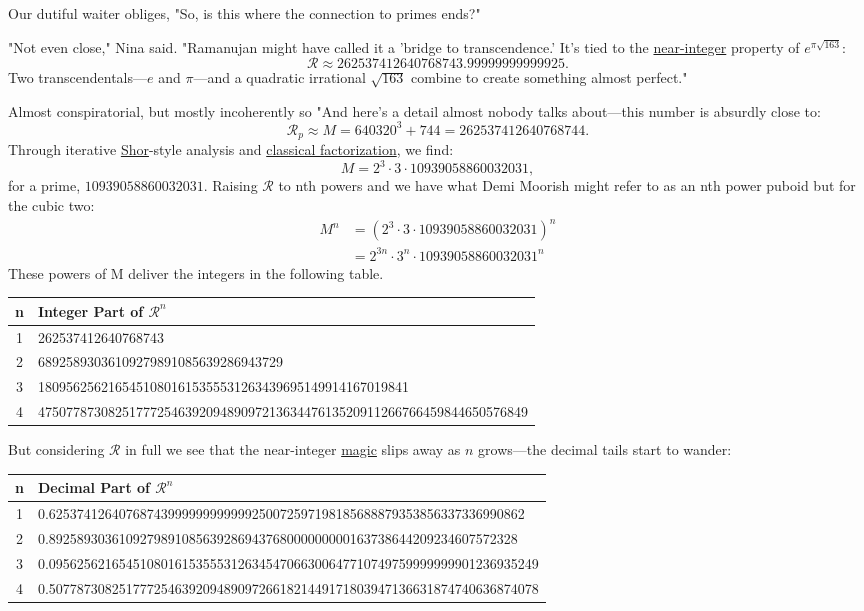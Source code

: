 Our dutiful waiter obliges, "So, is this where the connection to primes ends?"

"Not even close," Nina said. "Ramanujan might have called it a 'bridge to transcendence.' It’s tied to the \href{https://colab.research.google.com/drive/1K3itZdpqQkzb5UDWO-3MrIe6-KwopK0q?usp=sharing}{near-integer} property of \(e^{\pi \sqrt{163}}\):
\[
\mathcal{R} \approx 262537412640768743.99999999999925.
\]
Two transcendentals—\(e\) and \(\pi\)—and a quadratic irrational \(\sqrt{163}\) combine to create something almost perfect."

Almost conspiratorial, but mostly incoherently so "And here’s a detail almost nobody talks about—this number is absurdly close to:
\[
\mathcal{R}_p\approx M = 640320^3 + 744= 262537412640768744.
\]
Through iterative \href{https://colab.research.google.com/drive/1hn_NBpzrlv1TNKeRQAPDLabW04Jya0tv?usp=sharing}{Shor}-style analysis and \href{https://colab.research.google.com/drive/1Io6trNJBcgsMHd2it5qg-_ZYuJLJOb8p?usp=sharing}{classical factorization}, we find:
\[
M = 2^3 \cdot 3 \cdot 10939058860032031,
\]
for a prime, \(10939058860032031\). Raising \(\mathcal{R}\) to nth powers and we have what Demi Moorish might refer to as an nth power puboid but for the cubic two:
\begin{align*}
M^n &= (2^3 \cdot 3 \cdot 10939058860032031)^n\\
&= 2^{3n} \cdot 3^n \cdot 10939058860032031^n
\end{align*}
These powers of M deliver the integers in the following table.

\begin{longtable}{|c|p{12cm}|}
\hline
\textbf{n} & \textbf{Integer Part of \( \mathcal{R}^n \)} \\
\hline
1 & 262537412640768743 \\
2 & 68925893036109279891085639286943729 \\
3 & 18095625621654510801615355531263439695149914167019841 \\
4 & 4750778730825177725463920948909721363447613520911266766459844650576849 \\
\hline
\end{longtable}
\noindent
But considering \(\mathcal{R}\) in full we see that the near-integer \href{https://ramanunjan-rhapsody.vercel.app/}{magic} slips away as \(n\) grows—the decimal tails start to wander:

\begin{longtable}{|c|p{12cm}|}
\hline
\textbf{n} & \textbf{Decimal Part of \( \mathcal{R}^n \)} \\
\hline
1 & 0.62537412640768743999999999999250072597198185688879353856337336990862 \\
2 & 0.8925893036109279891085639286943768000000000163738644209234607572328 \\
3 & 0.0956256216545108016153555312634547066300647710749759999999901236935249 \\
4 & 0.5077873082517772546392094890972661821449171803947136631874740636874078\\
\hline
\end{longtable}

